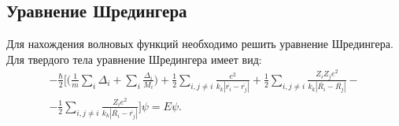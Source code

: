\subsection{Уравнение Шредингера}
Для нахождения волновых функций необходимо решить уравнение Шредингера. Для твердого тела уравнение Шредингера имеет вид:
\begin{gather*}
	-\frac{\hbar}{2}\Bigg[ \bigg( \frac{1}{m}\sum\limits_{i}\Delta_{i} + \sum\limits_{i}\frac{\Delta_{i}}{M_{i}} \bigg) + \frac{1}{2}\sum\limits_{i, j\neq i}\frac{e^{2}}{k_{k}|\overline{r_{i}} - \overline{r_{j}}|} + \frac{1}{2}\sum\limits_{i, j\neq i}\frac{Z_{i}Z_{j}e^{2}}{k_{k}|\overline{R_{i}} - \overline{R_{j}}|} -\\ - \frac{1}{2}\sum\limits_{i, j\neq i}\frac{Z_{i}e^{2}}{k_{k}|\overline{R_{i}} - \overline{r_{j}}|} \Bigg]\psi = E\psi.
\end{gather*}

